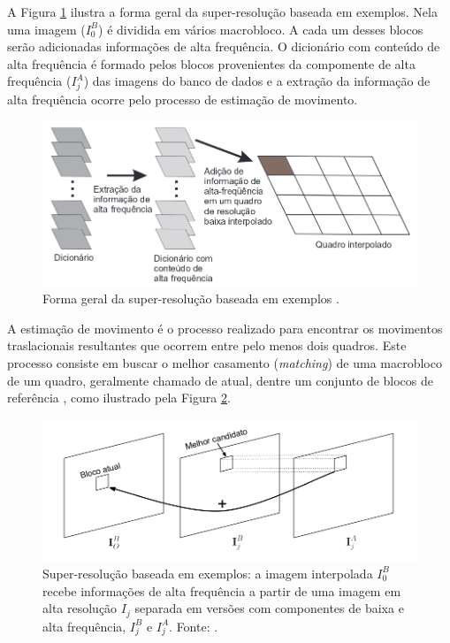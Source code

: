 A Figura \ref{fig:SR_exemp} ilustra a forma geral da super-resolução baseada em exemplos. Nela uma imagem ($I_0^B$) é dividida em vários macrobloco. A cada um desses blocos serão adicionadas informações de alta frequência. O dicionário com conteúdo de alta frequência é formado pelos blocos provenientes da compomente de alta frequência ($I_j^A$) das imagens do banco de dados e a extração da informação de alta frequência ocorre pelo processo de estimação de movimento.


\begin{figure}[h]
	\centering
	\includegraphics[scale=0.50]{figuras/super_resolucao_1.png}
	\caption{Forma geral da super-resolução baseada em exemplos \cite{hung2013realce}.}
	\label{fig:SR_exemp}
\end{figure}

A estimação de movimento é o processo realizado para encontrar os movimentos traslacionais resultantes que ocorrem entre pelo menos dois quadros. Este processo consiste em buscar o melhor casamento (\textit{matching}) de uma macrobloco de um quadro, geralmente chamado de atual, dentre um conjunto de blocos de referência \cite{hung2013realce}, como ilustrado pela Figura \ref{fig:SR_4}.

\begin{figure}[h]
	\centering
	\includegraphics[scale=0.50]{figuras/superresolucao_4.png}
	\caption{Super-resolução baseada em exemplos: a imagem interpolada $I_0^B$ recebe informações de alta frequência a partir de uma imagem em alta resolução $I_j$ separada em versões com componentes de baixa e alta frequência, $I_j^B$ e $I_j^A$. Fonte: \cite{garcia2013tecnicas}.}

	\label{fig:SR_4}
\end{figure}

